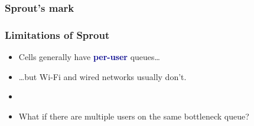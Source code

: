 \documentclass[svgnames]{beamer}
\begin{document}
\begin{frame}
\frametitle{Sprout's mark}


\end{frame}

\begin{frame}
\frametitle{Limitations of Sprout}

\Large

\begin{itemize}

\item Cells generally have \textcolor{DarkBlue}{\textbf{per-user}} queues\ldots

\item[] \ldots but Wi-Fi and wired networks usually don't.

\item[]

\item What if there are multiple users on the same bottleneck queue?

\end{itemize}




\end{frame}
\end{document}
